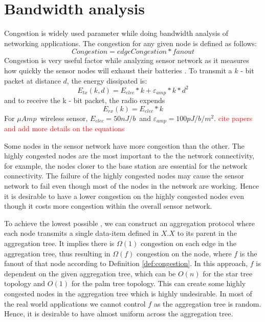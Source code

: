 \section{Bandwidth analysis}
	Congestion is widely used parameter while doing bandwidth analysis of networking applications. 
	The congestion for any given node is defined as follows:
	\begin{equation}\label{def:congestion}
		Congestion = edgeCongestion * fanout
	\end{equation}
	Congestion is very useful factor while analyzing sensor network as it measures how quickly the sensor nodes will exhaust their batteries \cite{madden2003design}. 
	To transmit a $k$ - bit packet at distance $d$, the energy dissipated is:
	\begin{equation}
		E_{tx}(k, d) = E_{elec} * k + \varepsilon_{amp} * k * d^{2}
	\end{equation}
	and to receive the k - bit packet, the radio expends
	\begin{equation}
		E_{rx}(k) = E_{elec} * k
	\end{equation}
	For $\mu Amp$\ wireless sensor, $E_{elec} = 50nJ/b$\ and $\varepsilon_{amp} = 100pJ/b/m^2$. \textcolor{red}{cite papers and add more details on the equations}

	Some nodes in the sensor network have more congestion than the other. 
	The highly congested nodes are the most important to the the network connectivity, for example, the nodes closer to the base station are essential for the network connectivity.
	The failure of the highly congested nodes may cause the sensor network to fail even though most of the nodes in the network are working.
	Hence it is desirable to have a lower congestion on the highly congested nodes even though it costs more congestion within the overall sensor network. 

	To achieve the lowest possible \informationRate, we can construct an aggregation protocol where each node transmits a single data-item defined in $X.X$ to its parent in the aggregation tree.
	It implies there is $\Omega(1)$ congestion on each edge in the aggregation tree, thus resulting in $\Omega(f)$ congestion on the node, where $f$ is the fanout of that node according to Definition \ref{def:congestion}.
	In this approach, $f$ is dependent on the given aggregation tree, which can be $O(n)$ for the star tree topology and $O(1)$ for the palm tree topology.
	This can create some highly congested nodes in the aggregation tree which is highly undesirable.
	In most of the real world applications we cannot control $f$ as the aggregation tree is random.
	Hence, it is desirable to have almost uniform \informationRate across the aggregation tree.

